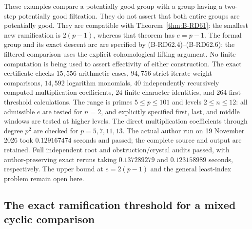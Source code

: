 \begin{remark}
\label{rem:B-RD62-scope}
These examples compare a potentially good group with a group having
a two-step potentially good filtration.  They do not assert that
both entire groups are potentially good.  They are compatible with
Theorem~\ref{thm:B-RD61}: the smallest new ramification is $2(p-1)$,
whereas that theorem has $e=p-1$.  The formal group and its exact
descent arc are specified by (B-RD62.4)--(B-RD62.6); the filtered
comparison uses the explicit cohomological lifting argument.
No finite computation is being used to assert effectivity of either
construction.  The exact certificate
checks $15{,}556$ arithmetic cases, $94{,}756$ strict iterate-weight
comparisons, $14{,}592$ logarithm monomials, $40$ independently
recursively computed multiplication coefficients, $24$ finite
character identities, and $264$ first-threshold calculations.
The range is primes $5\le p\le101$ and levels $2\le n\le12$:
all admissible $e$ are tested for $n=2$, and explicitly specified
first, last, and middle windows are tested at higher levels.
The direct multiplication coefficients through degree $p^2$ are
checked for $p=5,7,11,13$.  The actual author run on
19 November 2026 took $0.129167474$ seconds and passed; the complete
source and output are retained.  Full independent root and obstruction/crystal
audits passed, with author-preserving exact reruns taking
$0.137289279$ and $0.123158989$ seconds, respectively.
The upper bound at $e=2(p-1)$
and the general least-index problem remain open here.
\end{remark}


\subsection{The exact ramification threshold for a mixed cyclic comparison}

